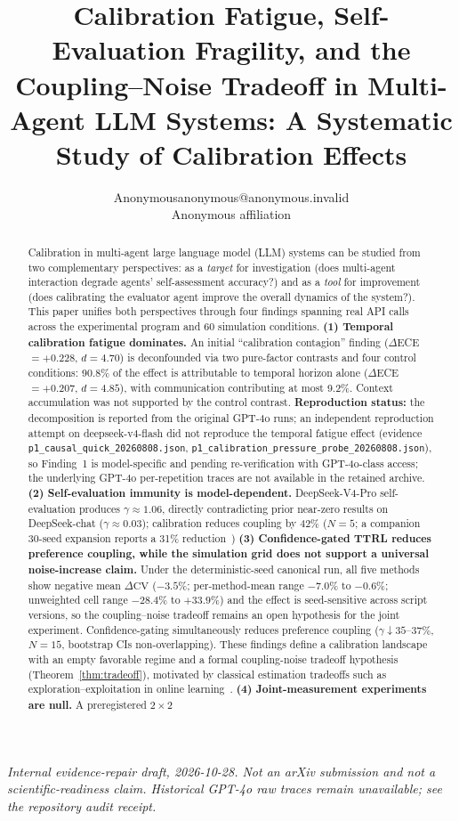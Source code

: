 \documentclass[11pt]{article}
\title{Calibration Fatigue, Self-Evaluation Fragility, and the Coupling--Noise Tradeoff in Multi-Agent LLM Systems: A Systematic Study of Calibration Effects}
\author{\name Anonymous\email anonymous@anonymous.invalid\\\addr Anonymous affiliation}
\date{}
\newcommand{\CV}{\ensuremath{\mathrm{CV}}}
\theoremstyle{definition}
\theoremstyle{remark}
\begin{document}
\maketitle
\begin{center}
\small\itshape Internal evidence-repair draft, 2026-10-28. Not an arXiv
submission and not a scientific-readiness claim. Historical GPT-4o raw
traces remain unavailable; see the repository audit receipt.
\end{center}

\begin{abstract}
Calibration in multi-agent large language model (LLM) systems can be studied from two complementary perspectives: as a \textit{target} for investigation (does multi-agent interaction degrade agents' self-assessment accuracy?) and as a \textit{tool} for improvement (does calibrating the evaluator agent improve the overall dynamics of the system?). This paper unifies both perspectives through four findings spanning real API calls across the experimental program and 60 simulation conditions. \textbf{(1) Temporal calibration fatigue dominates.} An initial ``calibration contagion'' finding ($\Delta$ECE $= +0.228$, $d = 4.70$) is deconfounded via two pure-factor contrasts and four control conditions: 90.8\% of the effect is attributable to temporal horizon alone ($\Delta$ECE $= +0.207$, $d = 4.85$), with communication contributing at most 9.2\%. Context accumulation was not supported by the control contrast. \textbf{Reproduction status:} the decomposition is reported from the original GPT-4o runs; an independent reproduction attempt on deepseek-v4-flash did not reproduce the temporal fatigue effect (evidence \texttt{p1\_causal\_quick\_20260808.json}, \texttt{p1\_calibration\_pressure\_probe\_20260808.json}), so Finding~1 is model-specific and pending re-verification with GPT-4o-class access; the underlying GPT-4o per-repetition traces are not available in the retained archive. \textbf{(2) Self-evaluation immunity is model-dependent.} DeepSeek-V4-Pro self-evaluation produces $\gamma \approx 1.06$, directly contradicting prior near-zero results on DeepSeek-chat ($\gamma \approx 0.03$); calibration reduces coupling by 42\% ($N{=}5$; a companion 30-seed expansion reports a 31\% reduction~\citep{companion2026}) \textbf{(3) Confidence-gated TTRL reduces preference coupling, while the simulation grid does not support a universal noise-increase claim.} Under the deterministic-seed canonical run, all five methods show negative mean $\Delta\CV$ ($-3.5\%$; per-method-mean range $-7.0\%$ to $-0.6\%$; unweighted cell range $-28.4\%$ to $+33.9\%$) and the effect is seed-sensitive across script versions, so the coupling--noise tradeoff remains an open hypothesis for the joint experiment. Confidence-gating simultaneously reduces preference coupling ($\gamma \downarrow 35$--$37\%$, $N{=}15$, bootstrap CIs non-overlapping). These findings define a calibration landscape with an empty favorable regime and a formal coupling-noise tradeoff hypothesis (Theorem~\ref{thm:tradeoff}), motivated by classical estimation tradeoffs such as exploration--exploitation in online learning~\citep{bubeck2012regret}. \textbf{(4) Joint-measurement experiments are null.} A preregistered $2 \times 2$ 
\end{abstract}
\end{document}
